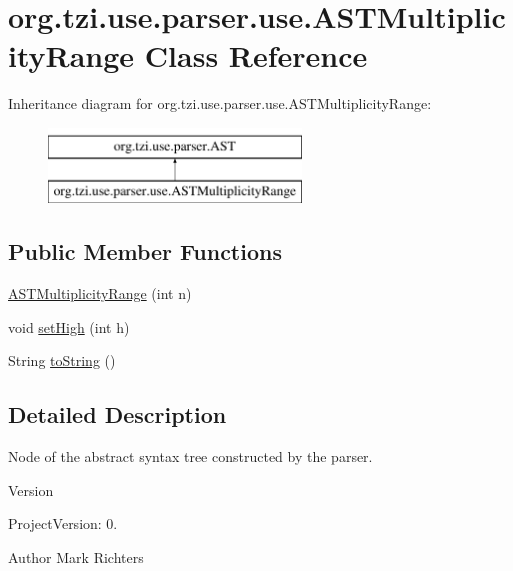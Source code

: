 \hypertarget{classorg_1_1tzi_1_1use_1_1parser_1_1use_1_1_a_s_t_multiplicity_range}{\section{org.\-tzi.\-use.\-parser.\-use.\-A\-S\-T\-Multiplicity\-Range Class Reference}
\label{classorg_1_1tzi_1_1use_1_1parser_1_1use_1_1_a_s_t_multiplicity_range}
}
Inheritance diagram for org.\-tzi.\-use.\-parser.\-use.\-A\-S\-T\-Multiplicity\-Range\-:\begin{figure}[H]
\begin{center}
\leavevmode
\includegraphics[height=2.000000cm]{classorg_1_1tzi_1_1use_1_1parser_1_1use_1_1_a_s_t_multiplicity_range}
\end{center}
\end{figure}
\subsection*{Public Member Functions}
\begin{DoxyCompactItemize}
\item 
\hyperlink{classorg_1_1tzi_1_1use_1_1parser_1_1use_1_1_a_s_t_multiplicity_range_afba592a622f4c183dfa897c5af3c0683}{A\-S\-T\-Multiplicity\-Range} (int n)
\item 
void \hyperlink{classorg_1_1tzi_1_1use_1_1parser_1_1use_1_1_a_s_t_multiplicity_range_a99821e10c36166ffa743a2cfd584594a}{set\-High} (int h)
\item 
String \hyperlink{classorg_1_1tzi_1_1use_1_1parser_1_1use_1_1_a_s_t_multiplicity_range_a36b6f7139e8d7ab478fd27862e1eda46}{to\-String} ()
\end{DoxyCompactItemize}


\subsection{Detailed Description}
Node of the abstract syntax tree constructed by the parser.

\begin{DoxyVersion}{Version}

\end{DoxyVersion}
\begin{DoxyParagraph}{Project\-Version\-:}
0. 
\end{DoxyParagraph}
\begin{DoxyAuthor}{Author}
Mark Richters 
\end{DoxyAuthor}


